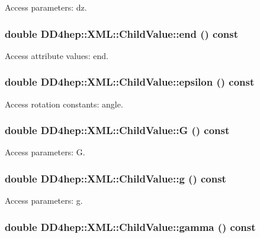 Access parameters: dz. \hypertarget{struct_d_d4hep_1_1_x_m_l_1_1_child_value_acbe060155600bd3e0d9b85995e5fe860}{
\subsubsection[{end}]{\setlength{\rightskip}{0pt plus 5cm}double DD4hep::XML::ChildValue::end () const}}
\label{struct_d_d4hep_1_1_x_m_l_1_1_child_value_acbe060155600bd3e0d9b85995e5fe860}


Access attribute values: end. \hypertarget{struct_d_d4hep_1_1_x_m_l_1_1_child_value_acd872e71652ddfc7f5064d42521de73a}{
\subsubsection[{epsilon}]{\setlength{\rightskip}{0pt plus 5cm}double DD4hep::XML::ChildValue::epsilon () const}}
\label{struct_d_d4hep_1_1_x_m_l_1_1_child_value_acd872e71652ddfc7f5064d42521de73a}


Access rotation constants: angle. \hypertarget{struct_d_d4hep_1_1_x_m_l_1_1_child_value_aaaf4536acd36cc1d9ec28b96be43a2a9}{
\subsubsection[{G}]{\setlength{\rightskip}{0pt plus 5cm}double DD4hep::XML::ChildValue::G () const}}
\label{struct_d_d4hep_1_1_x_m_l_1_1_child_value_aaaf4536acd36cc1d9ec28b96be43a2a9}


Access parameters: G. \hypertarget{struct_d_d4hep_1_1_x_m_l_1_1_child_value_a90471efd9069260ab44b90cc142d0aed}{
\subsubsection[{g}]{\setlength{\rightskip}{0pt plus 5cm}double DD4hep::XML::ChildValue::g () const}}
\label{struct_d_d4hep_1_1_x_m_l_1_1_child_value_a90471efd9069260ab44b90cc142d0aed}


Access parameters: g. \hypertarget{struct_d_d4hep_1_1_x_m_l_1_1_child_value_a72f420019e5b70da9a12ed3db3d06f12}{
\subsubsection[{gamma}]{\setlength{\rightskip}{0pt plus 5cm}double DD4hep::XML::ChildValue::gamma () const}}
\label{struct_d_d4hep_1_1_x_m_l_1_1_child_value_a72f420019e5b70da9a12ed3db3d06f12}


